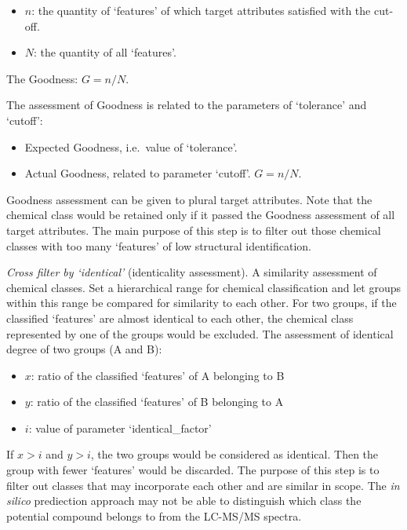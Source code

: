 \documentclass[
]{article}
\providecommand{\tightlist}{%
  \setlength{\itemsep}{0pt}\setlength{\parskip}{0pt}}
\begin{document}
\begin{itemize}
\item
  \(n\): the quantity of `features' of which target attributes satisfied
  with the cut-off.
\item
  \(N\): the quantity of all `features'.
\end{itemize}

The Goodness: \(G = n/N\).

The assessment of Goodness is related to the parameters of `tolerance'
and `cutoff':

\begin{itemize}
\tightlist
\item
  Expected Goodness, i.e.~value of `tolerance'.
\item
  Actual Goodness, related to parameter `cutoff'. \(G = n/N\).
\end{itemize}

Goodness assessment can be given to plural target attributes. Note that
the chemical class would be retained only if it passed the Goodness
assessment of all target attributes. The main purpose of this step is to
filter out those chemical classes with too many `features' of low
structural identification.

\emph{Cross filter by `identical'} (identicality assessment). A
similarity assessment of chemical classes. Set a hierarchical range for
chemical classification and let groups within this range be compared for
similarity to each other. For two groups, if the classified `features'
are almost identical to each other, the chemical class represented by
one of the groups would be excluded. The assessment of identical degree
of two groups (A and B):

\begin{itemize}
\tightlist
\item
  \(x\): ratio of the classified `features' of A belonging to B
\item
  \(y\): ratio of the classified `features' of B belonging to A
\item
  \(i\): value of parameter `identical\_factor'
\end{itemize}

If \(x > i\) and \(y > i\), the two groups would be considered as
identical. Then the group with fewer `features' would be discarded. The
purpose of this step is to filter out classes that may incorporate each
other and are similar in scope. The \emph{in silico} prediection
approach may not be able to distinguish which class the potential
compound belongs to from the LC-MS/MS spectra.
\end{document}
